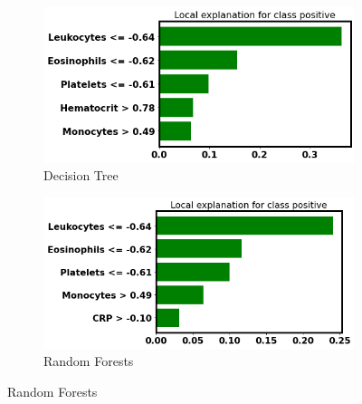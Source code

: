\clearpage

\null
\vfill

\begin{figure}[H]
\centering
\begin{subfigure}[b]{\textwidth}
    \centering
    \includegraphics[width=\textwidth]{figures/chapter_interp/lime_kaggle_dt.png}
    \caption{Decision Tree}
    \label{fig:lime_kaggle_dt}
\end{subfigure}
\hfill
\begin{subfigure}[b]{\textwidth}
    \centering
    \includegraphics[width=\textwidth]{figures/chapter_interp/lime_kaggle_rf.png}
    \caption{Random Forests}
    \label{fig:lime_kaggle_rf}
\end{subfigure}
\end{figure}
\vfill

\clearpage

\null
\vfill

